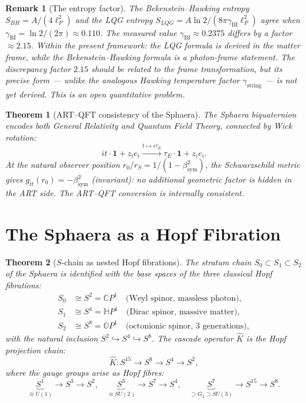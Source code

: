 \documentclass[12pt,a4paper]{article}
\newtheorem{theorem}{Theorem}[section]
\newtheorem*{remark}{Remark}
\newcommand{\bsym}{\beta_{\mathrm{sym}}}
\newcommand{\gstring}{\gamma_{\mathrm{string}}}
\newcommand{\gBI}{\gamma_{\mathrm{BI}}}
\newcommand{\lP}{\ell_P}
\newcommand{\KC}{\hat{K}}
\begin{document}
\begin{remark}[The entropy factor]
The Bekenstein--Hawking entropy $S_{BH}=A/(4\lP^2)$ and the LQG entropy
$S_{LQG}=A\ln 2/(8\pi\gBI\lP^2)$ agree when $\gBI=\ln 2/(2\pi)\approx 0.110$.
The measured value $\gBI\approx 0.2375$ differs by a factor $\approx 2.15$.
Within the present framework: the LQG formula is derived in the matter
frame, while the Bekenstein--Hawking formula is a photon-frame statement.
The discrepancy factor $2.15$ should be related to the frame
transformation, but its precise form --- unlike the analogous Hawking
temperature factor $\gstring$ --- is not yet derived.
This is an open quantitative problem.
\end{remark}

\begin{theorem}[ART--QFT consistency of the Sphaera]\label{thm:artqft}
The Sphaera biquaternion encodes both General Relativity and Quantum
Field Theory, connected by Wick rotation:
\[
  it\cdot\mathbf{1} + z_i e_i
  \xrightarrow{t\mapsto i\tau_E}
  \tau_E\cdot\mathbf{1} + z_i e_i.
\]
At the natural observer position $r_0/r_S = 1/(1-\bsym^2)$, the
Schwarzschild metric gives $g_{tt}(r_0)=-\bsym^2$ (invariant): no
additional geometric factor is hidden in the ART side.
The ART--QFT conversion is internally consistent.
\end{theorem}


\section{The Sphaera as a Hopf Fibration}
\label{sec:hopf}

\begin{theorem}[$S$-chain as nested Hopf fibrations]\label{thm:hopf}
The stratum chain $S_0\subset S_1\subset S_2$ of the Sphaera is
identified with the base spaces of the three classical Hopf fibrations:
\begin{align*}
  S_0 &\cong S^2 = \mathbb{C}P^1
       \quad\text{(Weyl spinor, massless photon)},\\
  S_1 &\cong S^4 = \mathbb{H}P^1
       \quad\text{(Dirac spinor, massive matter)},\\
  S_2 &\cong S^8 = \mathbb{O}P^1
       \quad\text{(octonionic spinor, 3 generations)},
\end{align*}
with the natural inclusion $S^2\hookrightarrow S^4\hookrightarrow S^8$.
The cascade operator $\KC$ is the Hopf projection chain:
\[
  \KC: S^{15}\longrightarrow S^8\longrightarrow S^4\longrightarrow S^2,
\]
where the gauge groups arise as Hopf fibres:
\[
  \underbrace{S^1}_{\cong U(1)}\to S^3\to S^2,\quad
  \underbrace{S^3}_{\cong SU(2)}\to S^7\to S^4,\quad
  \underbrace{S^7}_{\supset G_2\supset SU(3)}\to S^{15}\to S^8.
\]
\end{theorem}
\end{document}
